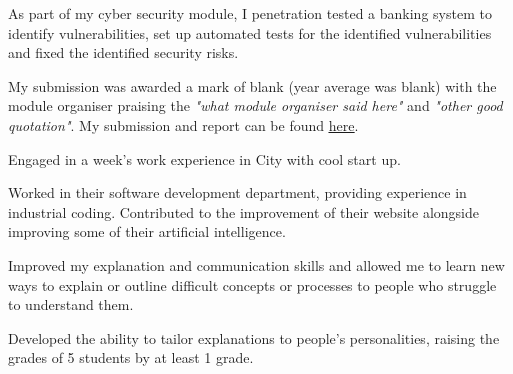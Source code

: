 \begin{minipage}[t]{0.66\textwidth}
\sectionspace %



\begin{tightitemize}
\item As part of my cyber security module, I penetration tested a banking system to identify vulnerabilities, set up automated tests for the identified vulnerabilities and fixed the identified security risks.
\item My submission was awarded a mark of blank (year average was blank) with the module organiser praising the \textit{"what module organiser said here"} and \textit{"other good quotation"}. My submission and report can be found \href{my report}{\underline{here}}.

\end{tightitemize}
 \sectionspace
{}

\begin{tightitemize}
\item Engaged in a week’s work experience in City with cool start up.
\item Worked in their software development department, providing experience in industrial coding. Contributed to the improvement of their website alongside improving some of their artificial intelligence.

\end{tightitemize}


\sectionspace %


\begin{tightitemize}
\item Improved my explanation and communication skills and allowed me to learn new ways to explain or outline difficult concepts or processes to people who struggle to understand them.
\item Developed the ability to tailor explanations to people's personalities, raising the grades of 5 students by at least 1 grade.
\end{tightitemize}

\sectionspace


\end{minipage}
